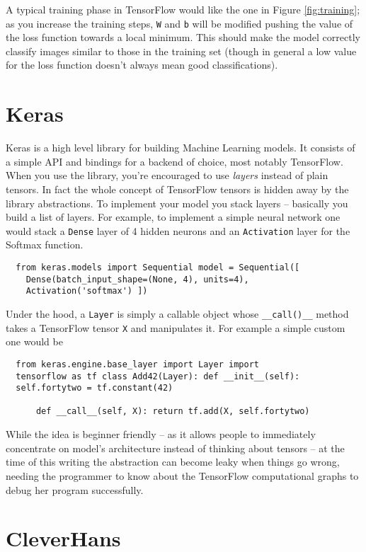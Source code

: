 A typical training phase in TensorFlow would like the one in
Figure \ref{fig:training}; as you increase the training
steps, \texttt{W} and \texttt{b} will be modified pushing
the value of the loss function towards a local minimum. This
should make the model correctly classify images similar to
those in the training set (though in general a low value for
the loss function doesn't always mean good classifications).

\section{Keras}
\label{sec:keras}

Keras is a high level library for building Machine Learning
models. It consists of a simple API and bindings for a
backend of choice, most notably TensorFlow. When you use the
library, you're encouraged to use \emph{layers} instead of
plain tensors. In fact the whole concept of TensorFlow
tensors is hidden away by the library abstractions. To
implement your model you stack layers -- basically you build
a list of layers. For example, to implement a simple neural
network one would stack a \texttt{Dense} layer of 4 hidden
neurons and an \texttt{Activation} layer for the Softmax
function.

\begin{verbatim}
  from keras.models import Sequential model = Sequential([
    Dense(batch_input_shape=(None, 4), units=4),
    Activation('softmax') ])
\end{verbatim}

Under the hood, a \texttt{Layer} is simply a callable object
whose \texttt{\_\_call()\_\_} method takes a TensorFlow
tensor \texttt{X} and manipulates it. For example a simple
custom one would be
\begin{verbatim}
  from keras.engine.base_layer import Layer import
  tensorflow as tf class Add42(Layer): def __init__(self):
  self.fortytwo = tf.constant(42)

      def __call__(self, X): return tf.add(X, self.fortytwo)
\end{verbatim}

While the idea is beginner friendly -- as it allows people
to immediately concentrate on model's architecture instead
of thinking about tensors -- at the time of this writing the
abstraction can become leaky when things go wrong, needing
the programmer to know about the TensorFlow computational
graphs to debug her program successfully.

\section{CleverHans}
\label{sec:cleverhans}

